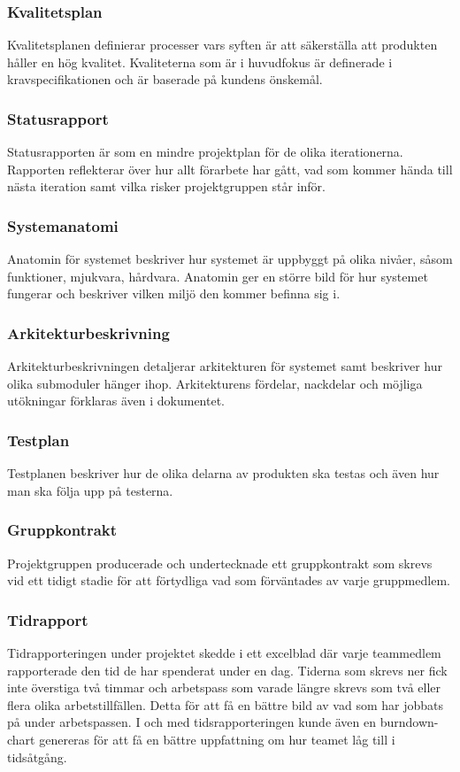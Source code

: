 \subsubsection*{Kvalitetsplan}
Kvalitetsplanen definierar processer vars syften är att säkerställa att produkten håller en hög kvalitet. Kvaliteterna som är i huvudfokus är definerade i kravspecifikationen och är baserade på kundens önskemål.

\subsubsection*{Statusrapport}
Statusrapporten är som en mindre projektplan för
de olika iterationerna. Rapporten reflekterar över hur allt förarbete har gått, vad som kommer
hända till nästa iteration samt vilka risker projektgruppen står inför.

\subsubsection*{Systemanatomi}
Anatomin för systemet beskriver hur systemet är uppbyggt på olika nivåer, såsom funktioner, mjukvara, hårdvara. Anatomin ger en större bild för hur systemet fungerar och beskriver vilken miljö den kommer befinna sig i.

\subsubsection*{Arkitekturbeskrivning}
Arkitekturbeskrivningen detaljerar arkitekturen för systemet samt beskriver hur olika submoduler hänger ihop. Arkitekturens fördelar, nackdelar och möjliga utökningar förklaras även i dokumentet.

\subsubsection*{Testplan}
Testplanen beskriver hur de olika delarna av produkten ska testas och även hur man ska följa upp på testerna.

\subsubsection*{Gruppkontrakt}
Projektgruppen producerade och undertecknade ett gruppkontrakt som skrevs vid ett tidigt stadie för att förtydliga vad som förväntades av varje gruppmedlem.

\subsubsection*{Tidrapport}
Tidrapporteringen under projektet skedde i ett excelblad där varje teammedlem rapporterade den tid de har spenderat under en dag. Tiderna som skrevs ner fick inte överstiga två timmar och arbetspass som varade längre skrevs som två eller flera olika arbetstillfällen. Detta för att få en bättre bild av vad som har jobbats på under arbetspassen. I och med tidsrapporteringen kunde även en burndown-chart genereras för att få en bättre uppfattning om hur teamet låg till i tidsåtgång.

